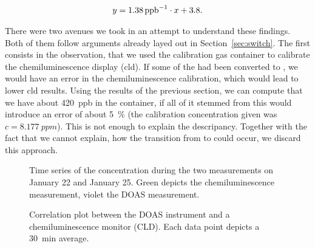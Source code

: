 \begin{align*}
  y = \SI{1.38}{{ppb}\tothe{-1}} \cdot x + 3.8.
\end{align*}

There were two avenues we took in an attempt to understand these
findings. Both of them follow arguments already layed out in
Section~\ref{sec:switch}. The first consists in the observation, that
we used the  calibration gas container to calibrate the
chemiluminescence display (cld). If some of the  had been converted
to , we would have an error in the chemiluminescence
calibration, which would lead to lower cld results. Using the results
of the previous section, we can compute that we have about \SI{420}{ppb}
 in the container, if all of it stemmed from  this
would introduce an error of about \SI{5}{\percent} (the calibration
concentration given was $c = \SI{8.177}{ppm}$). This is not enough to
explain the descripancy. Together with the fact that we cannot
explain, how the transition from  to  could occur, we
discard this approach.

\begin{figure}[htbp]
  \centering
  
  \hfill
  
  \caption{Time series of the  concentration during the two
    measurements on January 22 and January 25. Green depicts the
    chemiluminescence measurement, violet the DOAS measurement.}
  \label{fig:corr-ts}
\end{figure}
\begin{figure}[H]
  \centering
  
  \caption{Correlation plot between the DOAS instrument and a
    chemiluminescence monitor (CLD). Each data point depicts a
    \SI{30}{\minute} average.}
  \label{fig:cld-corr}
\end{figure}

